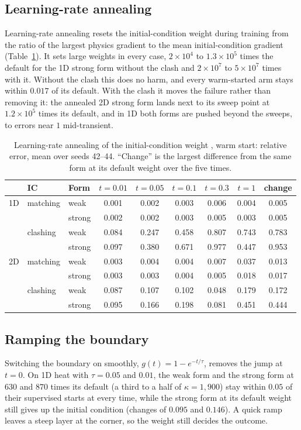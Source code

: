 \documentclass[a4paper,fleqn]{cas-sc}
\begin{document}
\subsection{Learning-rate annealing}
Learning-rate annealing \cite{wang2021gradientflow} resets the initial-condition weight
during training from the ratio of the largest physics gradient to the mean initial-condition gradient
(Table~\ref{tab:anneal}). It sets large weights in every case, $2\times10^4$ to $1.3\times10^5$ times the default for the
1D strong form without the clash and $2\times10^7$ to $5\times10^7$ times with it. Without the clash this does no harm,
and every warm-started arm stays within $0.017$ of its default. With the clash it moves the failure rather than removing
it: the annealed 2D strong form lands next to its sweep point at $1.2\times10^5$ times its default, and in 1D both forms
are pushed beyond the sweeps, to errors near $1$ mid-transient.

\begin{table}[htbp]
\centering
\caption{Learning-rate annealing of the initial-condition weight \cite{wang2021gradientflow}, warm start: relative error,
mean over seeds 42--44. ``Change'' is the largest difference from the same form at its default weight over the five
times.}
\label{tab:anneal}
\small
\setlength{\tabcolsep}{4pt}
\begin{tabular}{lllcccccc}
\toprule
 & IC & Form & $t=0.01$ & $t=0.05$ & $t=0.1$ & $t=0.3$ & $t=1$ & change \\
\midrule
1D & matching & weak & 0.001 & 0.002 & 0.003 & 0.006 & 0.004 & 0.005 \\
 & & strong & 0.002 & 0.002 & 0.003 & 0.005 & 0.003 & 0.005 \\
 & clashing & weak & 0.084 & 0.247 & 0.458 & 0.807 & 0.743 & 0.783 \\
 & & strong & 0.097 & 0.380 & 0.671 & 0.977 & 0.447 & 0.953 \\
\midrule
2D & matching & weak & 0.003 & 0.004 & 0.004 & 0.007 & 0.037 & 0.013 \\
 & & strong & 0.003 & 0.003 & 0.004 & 0.005 & 0.018 & 0.017 \\
 & clashing & weak & 0.087 & 0.107 & 0.102 & 0.048 & 0.179 & 0.172 \\
 & & strong & 0.095 & 0.166 & 0.198 & 0.081 & 0.451 & 0.444 \\
\bottomrule
\end{tabular}
\end{table}

\subsection{Ramping the boundary}
Switching the boundary on smoothly, $g(t)=1-e^{-t/\tau}$, removes the jump at $t=0$. On 1D
heat with $\tau=0.05$ and $0.01$, the weak form and the strong form at $630$ and $870$ times its default (a third to a half
of $\kappa=1{,}900$) stay within $0.05$ of their supervised starts at every time, while the strong form at its default
weight still gives up the initial condition (changes of $0.095$ and $0.146$). A quick ramp leaves a steep layer at the
corner, so the weight still decides the outcome.
\end{document}
